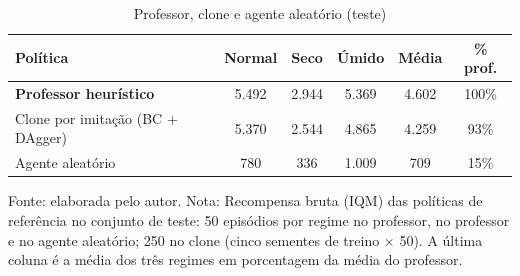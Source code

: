 \begin{table}[htbp]
\centering
\small\setlength{\tabcolsep}{4pt}
\caption{Professor, clone e agente aleatório (teste)}
\label{tab:referencias}
\begin{tabular}{l c c c c c}
\hline
\textbf{Política} & \textbf{Normal} & \textbf{Seco} & \textbf{Úmido} & \textbf{Média} & \textbf{\% prof.} \\ \hline
\textbf{Professor heurístico} & 5.492 & 2.944 & 5.369 & 4.602 & 100\% \\
Clone por imitação (BC + DAgger) & 5.370 & 2.544 & 4.865 & 4.259 & 93\% \\
Agente aleatório & 780 & 336 & 1.009 & 709 & 15\% \\
\hline
\end{tabular}

{\footnotesize Fonte: elaborada pelo autor. Nota: Recompensa bruta (IQM) das políticas de referência no conjunto de teste: 50 episódios por regime no professor, no professor e no agente aleatório; 250 no clone (cinco sementes de treino $\times$ 50). A última coluna é a média dos três regimes em porcentagem da média do professor.}
\end{table}
